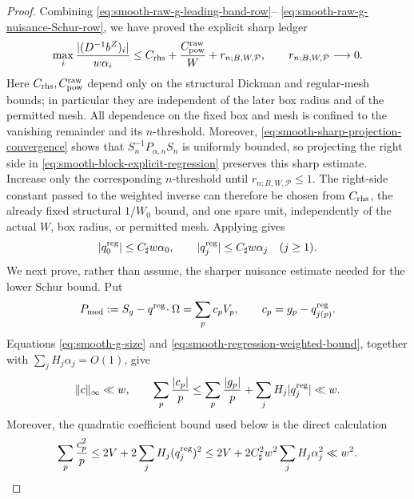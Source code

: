 \documentclass[11pt]{article}
\numberwithin{equation}{section}
\theoremstyle{definition}
\theoremstyle{remark}
\newcommand{\1}{\mathbf 1}
\begin{document}
\begin{proof}
Combining
\eqref{eq:smooth-raw-g-leading-band-row}--
\eqref{eq:smooth-raw-g-nuisance-Schur-row}, we have proved the explicit
sharp ledger
\begin{equation}
 \max_i\frac{|(D^{-1}b^Z)_i|}{w\alpha_i}
 \leq C_{\rm rhs}+\frac{C_{\rm pow}^{\rm raw}}W
       +r_{n;B,W,\mathcal P},
 \qquad r_{n;B,W,\mathcal P}\longrightarrow0.
 \label{eq:smooth-raw-g-complete-sharp-ledger}
\end{equation}
Here \(C_{\rm rhs},C_{\rm pow}^{\rm raw}\) depend only on the structural Dickman
and regular-mesh bounds; in particular they are independent of the later
box radius and of the permitted mesh.  All dependence on the fixed box
and mesh is confined to the vanishing remainder and its \(n\)-threshold.
Moreover, \eqref{eq:smooth-sharp-projection-convergence} shows that
\(S_n^{-1}P_{\alpha,n}S_n\) is uniformly bounded, so projecting the
right side in \eqref{eq:smooth-block-explicit-regression} preserves this
sharp estimate.  Increase only the corresponding \(n\)-threshold until
\(r_{n;B,W,\mathcal P}\leq1\).  The right-side constant passed to the
weighted inverse can therefore be chosen from \(C_{\rm rhs}\), the already fixed
structural \(1/W_0\) bound, and one spare unit, independently of the
actual \(W\), box radius, or permitted mesh.
Applying
 gives
\begin{equation}
 |q_0^{\rm reg}|\le C_{\sharp}w\alpha_0,\qquad
 |q_j^{\rm reg}|\le C_{\sharp}w\alpha_j\quad(j\geq1).
\label{eq:smooth-regression-weighted-bound}
\end{equation}
We next prove, rather than assume, the sharper nuisance estimate needed
for the lower Schur bound.  Put
\[
 P_{\rm med}:=S_g-q^{\rm reg}\!\cdot\Omega=\sum_pc_pV_p,
 \qquad c_p=g_p-q_{j(p)}^{\rm reg}.
\]
Equations \eqref{eq:smooth-g-size} and
\eqref{eq:smooth-regression-weighted-bound}, together with
\(\sum_jH_j\alpha_j=O(1)\), give
\begin{equation}
 \|c\|_\infty\ll w,\qquad
 \sum_p\frac{|c_p|}{p}\leq
 \sum_p\frac{|g_p|}{p}
 +\sum_jH_j|q_j^{\rm reg}|\ll w.
 \label{eq:smooth-postband-coefficient-first-moment}
\end{equation}
Moreover, the quadratic coefficient bound used below is the direct
calculation
\begin{equation}
 \sum_p\frac{c_p^2}{p}
 \leq2V+2\sum_jH_j(q_j^{\rm reg})^2
 \leq2V+2C_\sharp^2w^2\sum_jH_j\alpha_j^2
 \ll w^2.
 \label{eq:smooth-postband-coefficient-second-moment}
\end{equation}


\end{proof}
\end{document}
